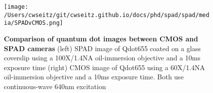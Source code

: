 



\begin{figure*}[t]
\centering
\texttt{[image: /Users/cwseitz/git/cwseitz.github.io/docs/phd/spad/spad/media/SPADvCMOS.png]}
\caption{\textbf{Comparison of quantum dot images between CMOS and SPAD cameras} (left) SPAD image of Qdot655 coated on a glass coverslip using a 100X/1.4NA oil-immersion objective and a 10ms exposure time (right) CMOS image of Qdot655 using a 60X/1.4NA oil-immersion objective and a 10ms exposure time. Both use continuous-wave 640nm excitation}
\label{fig:fig4}
\end{figure*}    

